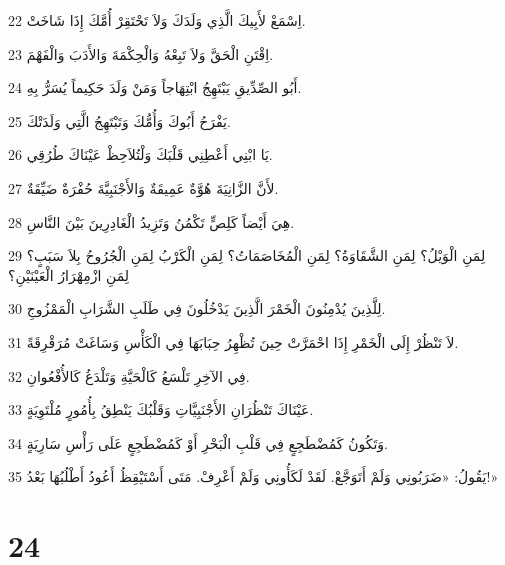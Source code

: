 \par 22 اِسْمَعْ لأَبِيكَ الَّذِي وَلَدَكَ وَلاَ تَحْتَقِرْ أُمَّكَ إِذَا شَاخَتْ.
\par 23 اِقْتَنِ الْحَقَّ وَلاَ تَبِعْهُ وَالْحِكْمَةَ وَالأَدَبَ وَالْفَهْمَ.
\par 24 أَبُو الصِّدِّيقِ يَبْتَهِجُ ابْتِهَاجاً وَمَنْ وَلَدَ حَكِيماً يُسَرُّ بِهِ.
\par 25 يَفْرَحُ أَبُوكَ وَأُمُّكَ وَتَبْتَهِجُ الَّتِي وَلَدَتْكَ.
\par 26 يَا ابْنِي أَعْطِنِي قَلْبَكَ وَلْتُلاَحِظْ عَيْنَاكَ طُرُقِي.
\par 27 لأَنَّ الزَّانِيَةَ هُوَّةٌ عَمِيقَةٌ وَالأَجْنَبِيَّةَ حُفْرَةٌ ضَيِّقَةٌ.
\par 28 هِيَ أَيْضاً كَلِصٍّ تَكْمُنُ وَتَزِيدُ الْغَادِرِينَ بَيْنَ النَّاسِ.
\par 29 لِمَنِ الْوَيْلُ؟ لِمَنِ الشَّقَاوَةُ؟ لِمَنِ الْمُخَاصَمَاتُ؟ لِمَنِ الْكَرْبُ لِمَنِ الْجُرُوحُ بِلاَ سَبَبٍ؟ لِمَنِ ازْمِهْرَارُ الْعَيْنَيْنِ؟
\par 30 لِلَّذِينَ يُدْمِنُونَ الْخَمْرَ الَّذِينَ يَدْخُلُونَ فِي طَلَبِ الشَّرَابِ الْمَمْزُوجِ.
\par 31 لاَ تَنْظُرْ إِلَى الْخَمْرِ إِذَا احْمَرَّتْ حِينَ تُظْهِرُ حِبَابَهَا فِي الْكَأْسِ وَسَاغَتْ مُرَقْرِقَةً.
\par 32 فِي الآخِرِ تَلْسَعُ كَالْحَيَّةِ وَتَلْدَغُ كَالأُفْعُوانِ.
\par 33 عَيْنَاكَ تَنْظُرَانِ الأَجْنَبِيَّاتِ وَقَلْبُكَ يَنْطِقُ بِأُمُورٍ مُلْتَوِيَةٍ.
\par 34 وَتَكُونُ كَمُضْطَجِعٍ فِي قَلْبِ الْبَحْرِ أَوْ كَمُضْطَجِعٍ عَلَى رَأْسِ سَارِيَةٍ.
\par 35 يَقُولُ: «ضَرَبُونِي وَلَمْ أَتَوَجَّعْ. لَقَدْ لَكَأُونِي وَلَمْ أَعْرِفْ. مَتَى أَسْتَيْقِظُ أَعُودُ أَطْلُبُهَا بَعْدُ!»

\chapter{24}

